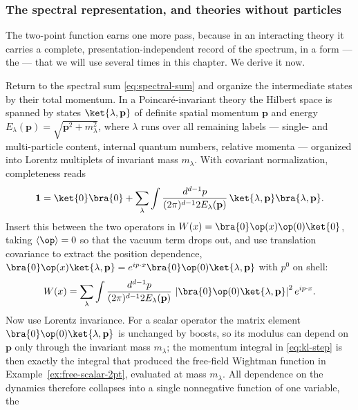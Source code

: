 \subsubsection{The spectral representation, and theories without particles}
\label{sec:kallen-lehmann}

The two-point function earns one more pass, because in an interacting
theory it carries a complete, presentation-independent record of the
spectrum, in a form --- the  ---
that we will use several times in this chapter. We derive it now.

Return to the spectral sum \eqref{eq:spectral-sum} and organize the
intermediate states by their total momentum. In a Poincar\'e-invariant theory
the Hilbert space is spanned by states $\ket{\lambda, \mathbf p}$ of definite
spatial momentum $\mathbf p$ and energy $E_\lambda(\mathbf p) = \sqrt{\mathbf
p^2 + m_\lambda^2}$, where $\lambda$ runs over all remaining labels ---
single- and multi-particle content, internal quantum numbers, relative
momenta --- organized into Lorentz multiplets of invariant mass $m_\lambda$.
With covariant normalization, completeness reads
\begin{equation}
\mathbf 1 = \ket{0}\bra{0} + \sum_\lambda \int
\frac{d^{d-1}p}{(2\pi)^{d-1} 2E_\lambda(\mathbf p)}\,
\ket{\lambda, \mathbf p}\bra{\lambda, \mathbf p}.
\label{eq:completeness}
\end{equation}
Insert this between the two operators in $W(x) =
\bra{0}\op(x)\op(0)\ket{0}$, taking $\langle \op \rangle = 0$ so that the
vacuum term drops out, and use translation covariance to extract the position
dependence, $\bra{0}\op(x)\ket{\lambda,\mathbf p} = e^{ip\cdot
x}\bra{0}\op(0)\ket{\lambda, \mathbf p}$ with $p^0$ on shell:
\begin{equation}
W(x) = \sum_\lambda \int
\frac{d^{d-1}p}{(2\pi)^{d-1}2E_\lambda(\mathbf p)}\,
\left|\bra{0}\op(0)\ket{\lambda,\mathbf p}\right|^2 e^{ip\cdot x}.
\label{eq:kl-step}
\end{equation}
Now use Lorentz invariance. For a scalar operator the matrix element
$\bra{0}\op(0)\ket{\lambda,\mathbf p}$ is unchanged by boosts, so its modulus
can depend on $\mathbf p$ only through the invariant mass $m_\lambda$; the
momentum integral in \eqref{eq:kl-step} is then exactly the integral that
produced the free-field Wightman function in
Example~\ref{ex:free-scalar-2pt}, evaluated at mass $m_\lambda$. All
dependence on the dynamics therefore collapses into a single nonnegative
function of one variable, the 
